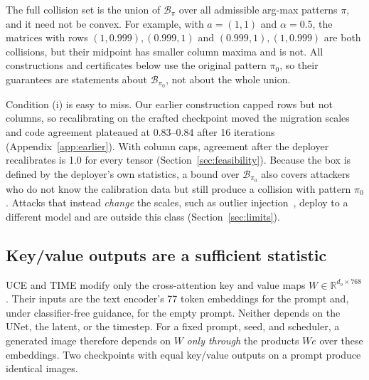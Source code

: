 \documentclass[conference]{IEEEtran}
\begin{document}
The full collision set is the union of $\mathcal{B}_\pi$ over all admissible arg-max
patterns $\pi$, and it need not be convex. For example, with $a=(1,1)$ and
$\alpha=0.5$, the matrices with rows $(1,0.999),(0.999,1)$ and $(0.999,1),(1,0.999)$ are
both collisions, but their midpoint has smaller column maxima and is not. All
constructions and certificates below use the original pattern $\pi_0$, so their
guarantees are statements about $\mathcal{B}_{\pi_0}$, not about the whole union.

Condition (i) is easy to miss. Our earlier construction capped rows but not columns,
so recalibrating on the crafted checkpoint moved the migration scales and code
agreement plateaued at 0.83--0.84 after 16 iterations (Appendix~\ref{app:earlier}).
With column caps, agreement after the deployer recalibrates is 1.0 for every tensor
(Section~\ref{sec:feasibility}). Because the box is defined by the deployer's own
statistics, a bound over $\mathcal{B}_{\pi_0}$ also covers attackers who do not know
the calibration data but still produce a collision with pattern $\pi_0$. Attacks that instead \emph{change} the scales,
such as outlier injection~\cite{zhan2026}, deploy to a different model and are
outside this class (Section~\ref{sec:limits}).

\subsection{Key/value outputs are a sufficient statistic}
UCE and TIME modify only the cross-attention key and value maps
$W\in\mathbb{R}^{d_o\times768}$. Their inputs are the text encoder's 77 token
embeddings for the prompt and, under classifier-free guidance, for the empty prompt.
Neither depends on the UNet, the latent, or the timestep. For a fixed prompt, seed,
and scheduler, a generated image therefore depends on $W$ \emph{only through} the
products $We$ over these embeddings. Two checkpoints with equal key/value outputs on
a prompt produce identical images.
\end{document}

